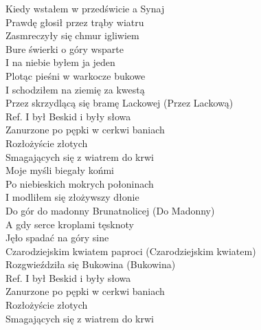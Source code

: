 
Kiedy wstałem w przedświcie a Synaj \\
Prawdę głosił przez trąby wiatru \\
Zasmreczyły się chmur igliwiem \\
Bure świerki o góry wsparte \\
I na niebie byłem ja jeden \\
Plotąc pieśni w warkocze bukowe \\
I schodziłem na ziemię za kwestą \\
Przez skrzydlącą się bramę Lackowej (Przez Lackową)\\
\hops
Ref. I był Beskid i były słowa \tab{}\\
 Zanurzone po pępki w cerkwi baniach\\
 Rozłożyście złotych \tab{}\\
 Smagających się z wiatrem do krwi\\
\hops
Moje myśli biegały końmi \\
Po niebieskich mokrych połoninach \\
I modliłem się złożywszy dłonie \\
Do gór do madonny Brunatnolicej (Do Madonny)\\
A gdy serce kroplami tęsknoty \\
Jęło spadać na góry sine \\
Czarodziejskim kwiatem paproci (Czarodziejskim kwiatem)\\
Rozgwieździła się Bukowina (Bukowina)\\
\hops
Ref. I był Beskid i były słowa\\
 Zanurzone po pępki w cerkwi baniach\\
 Rozłożyście złotych \\
 Smagających się z wiatrem do krwi
